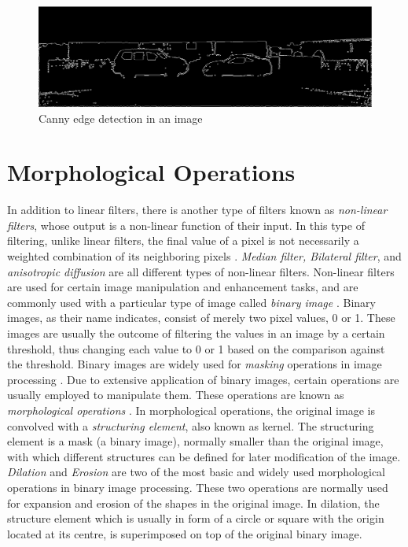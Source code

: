 \begin{figure}[H]
\centering
\includegraphics[scale=0.35]{mask5nodil}
\caption{Canny edge detection in an image}
\label{fig:edgenodil}
\end{figure} 

\section{Morphological Operations}
In addition to linear filters, there is another type of filters known as {\it non-linear filters}, whose output is a non-linear function of their input. 
In this type of filtering, unlike linear filters, the final value of a pixel is not necessarily 
a weighted combination of its neighboring pixels \cite{sze11}. 
{\it Median filter, Bilateral filter}, and {\it anisotropic diffusion} are all different types of non-linear filters. Non-linear filters are used for certain image manipulation 
and enhancement tasks, and are commonly used with a particular type of image called {\it binary
image} \cite{sze11}. Binary images, as their name indicates, consist of merely two pixel values, 0 or 1. These images are usually the outcome of filtering the values in an image 
by a certain threshold, thus changing each value to 0 or 1 based on the comparison against the threshold. Binary images are
widely used for {\it masking} operations in image processing \cite{sze11}. Due to extensive application of binary images, certain operations are usually employed to manipulate them. 
These operations are known as {\it morphological operations} \cite{ritt00}.
In morphological operations, the original image is convolved with a {\it structuring element}, also known as kernel. 
The structuring element is a mask (a binary image), normally smaller than the original image, 
with which different structures can be defined for later modification of the image. 
{\it Dilation} and {\it Erosion} are two of the most basic and widely used morphological operations in binary image processing.
These two operations are normally used for expansion and erosion of the shapes in the original image. 
In dilation, the structure element which is usually in form of a circle or square with the origin located at its centre, is superimposed on top of the original binary image.
